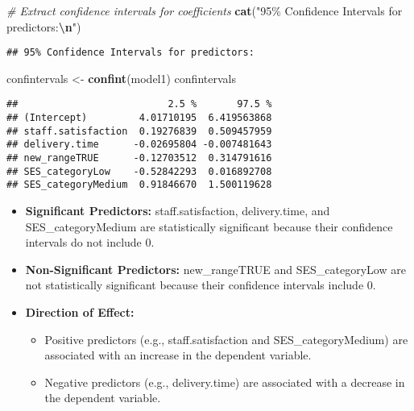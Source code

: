 \documentclass[
]{article}
\newenvironment{Shaded}{\begin{snugshade}}{\end{snugshade}}
\newcommand{\CommentTok}[1]{\textcolor[rgb]{0.56,0.35,0.01}{\textit{#1}}}
\newcommand{\FunctionTok}[1]{\textcolor[rgb]{0.13,0.29,0.53}{\textbf{#1}}}
\newcommand{\NormalTok}[1]{#1}
\newcommand{\OtherTok}[1]{\textcolor[rgb]{0.56,0.35,0.01}{#1}}
\newcommand{\SpecialCharTok}[1]{\textcolor[rgb]{0.81,0.36,0.00}{\textbf{#1}}}
\newcommand{\StringTok}[1]{\textcolor[rgb]{0.31,0.60,0.02}{#1}}
\providecommand{\tightlist}{%
  \setlength{\itemsep}{0pt}\setlength{\parskip}{0pt}}
\begin{document}
\begin{Shaded}
\begin{Highlighting}[]
\CommentTok{\# Extract confidence intervals for coefficients}
\FunctionTok{cat}\NormalTok{(}\StringTok{"95\% Confidence Intervals for predictors:}\SpecialCharTok{\textbackslash{}n}\StringTok{"}\NormalTok{)}
\end{Highlighting}
\end{Shaded}

\begin{verbatim}
## 95% Confidence Intervals for predictors:
\end{verbatim}

\begin{Shaded}
\begin{Highlighting}[]
\NormalTok{confintervals }\OtherTok{\textless{}{-}} \FunctionTok{confint}\NormalTok{(model1)}
\NormalTok{confintervals}
\end{Highlighting}
\end{Shaded}

\begin{verbatim}
##                          2.5 %       97.5 %
## (Intercept)         4.01710195  6.419563868
## staff.satisfaction  0.19276839  0.509457959
## delivery.time      -0.02695804 -0.007481643
## new_rangeTRUE      -0.12703512  0.314791616
## SES_categoryLow    -0.52842293  0.016892708
## SES_categoryMedium  0.91846670  1.500119628
\end{verbatim}

\begin{itemize}
\tightlist
\item
  \textbf{Significant Predictors:} staff.satisfaction, delivery.time,
  and SES\_categoryMedium are statistically significant because their
  confidence intervals do not include 0.
\item
  \textbf{Non-Significant Predictors:} new\_rangeTRUE and
  SES\_categoryLow are not statistically significant because their
  confidence intervals include 0.
\item
  \textbf{Direction of Effect:}

  \begin{itemize}
  \tightlist
  \item
    Positive predictors (e.g., staff.satisfaction and
    SES\_categoryMedium) are associated with an increase in the
    dependent variable.
  \item
    Negative predictors (e.g., delivery.time) are associated with a
    decrease in the dependent variable.
  \end{itemize}
\end{itemize}
\end{document}
